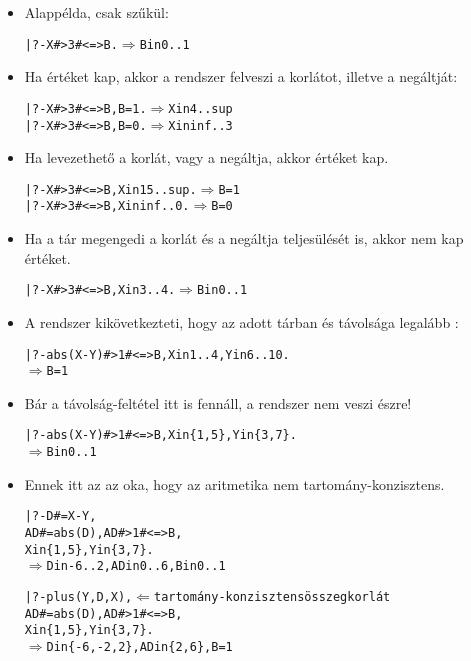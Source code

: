 \begin{itemize}
\item Alappélda, csak  szűkül:
\begin{alltt}
| ?- X#>3 #<=> B.                  \(\Rightarrow\) B in 0..1
\end{alltt}
\item Ha  értéket kap, akkor a rendszer felveszi a korlátot, illetve a negáltját:
\begin{alltt}
| ?- X#>3 #<=> B, B = 1.           \(\Rightarrow\) X in 4..sup
| ?- X#>3 #<=> B, B = 0.           \(\Rightarrow\) X in inf..3
\end{alltt}
\item Ha levezethető a korlát, vagy a negáltja, akkor  értéket kap.
\begin{alltt}
| ?- X#>3 #<=> B, X in 15..sup.    \(\Rightarrow\) B = 1
| ?- X#>3 #<=> B, X in inf..0.     \(\Rightarrow\) B = 0
\end{alltt}
\item Ha a tár megengedi a korlát és a negáltja teljesülését is, akkor  nem
kap értéket.
\begin{alltt}
| ?- X#>3 #<=> B, X in 3..4.       \(\Rightarrow\) B in 0..1
\end{alltt}
\item A rendszer kikövetkezteti, hogy az adott tárban  és  távolsága legalább :
\begin{alltt}
| ?- abs(X-Y)#>1 #<=> B, X in 1..4, Y in 6..10.
             \(\Rightarrow\) B = 1
\end{alltt}
\item Bár a távolság-feltétel itt is fennáll, a rendszer nem veszi észre!
\begin{alltt}
| ?- abs(X-Y)#>1 #<=> B, X in \{1,5\}, Y in \{3,7\}.
             \(\Rightarrow\) B in 0..1
\end{alltt}
\item Ennek itt az az oka, hogy az aritmetika nem tartomány-konzisztens.
\begin{alltt}
| ?- D #= X-Y,
     AD #= abs(D), AD#>1 #<=> B,
     X in \{1,5\}, Y in \{3,7\}.
             \(\Rightarrow\) D in -6..2, AD in 0..6, B in 0..1
\end{alltt}
\begin{alltt}
| ?- plus(Y, D, X),      \(\Leftarrow\){\rm tartomány-konzisztens összegkorlát}
     AD #= abs(D), AD#>1 #<=> B,
     X in \{1,5\}, Y in \{3,7\}.
             \(\Rightarrow\) D in \{-6,-2,2\}, AD in \{2,6\}, B = 1
\end{alltt}
\end{itemize}

